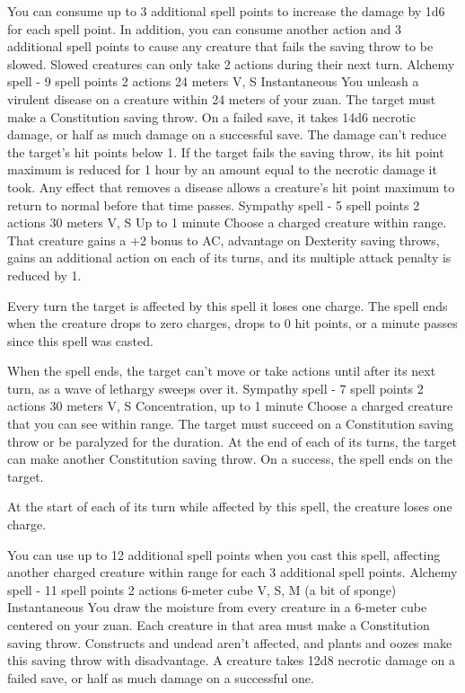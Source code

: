     You can consume up to 3 additional spell points to increase the damage by 1d6 for each spell point.
    In addition, you can consume another action and 3 additional spell points to cause any creature that fails the saving throw to be slowed.
    Slowed creatures can only take 2 actions during their next turn.
    {Alchemy spell - 9 spell points}
    {2 actions}
    {24 meters}
    {V, S}
    {Instantaneous}
    You unleash a virulent disease on a creature within 24 meters of your zuan.
    The target must make a Constitution saving throw.
    On a failed save, it takes 14d6 necrotic damage, or half as much damage on a successful save.
    The damage can't reduce the target's hit points below 1.
    If the target fails the saving throw, its hit point maximum is reduced for 1 hour by an amount equal to the necrotic damage it took.
    Any effect that removes a disease allows a creature's hit point maximum to return to normal before that time passes.
    {Sympathy spell - 5 spell points}
    {2 actions}
    {30 meters}
    {V, S}
    {Up to 1 minute}
    Choose a charged creature within range.
    That creature gains a +2 bonus to AC, advantage on Dexterity saving throws, gains an additional action on each of its turns, and its multiple attack penalty is reduced by 1.

    Every turn the target is affected by this spell it loses one charge.
    The spell ends when the creature drops to zero charges, drops to 0 hit points, or a minute passes since this spell was casted.

    When the spell ends, the target can't move or take actions until after its next turn, as a wave of lethargy sweeps over it.
    {Sympathy spell - 7 spell points}
    {2 actions}
    {30 meters}
    {V, S}
    {Concentration, up to 1 minute}
    Choose a charged creature that you can see within range.
    The target must succeed on a Constitution saving throw or be paralyzed for the duration.
    At the end of each of its turns, the target can make another Constitution saving throw.
    On a success, the spell ends on the target.

    At the start of each of its turn while affected by this spell, the creature loses one charge.

    You can use up to 12 additional spell points when you cast this spell, affecting another charged creature within range for each 3 additional spell points.
    {Alchemy spell - 11 spell points}
    {2 actions}
    {6-meter cube}
    {V, S, M (a bit of sponge)}
    {Instantaneous}
    You draw the moisture from every creature in a 6-meter cube centered on your zuan.
    Each creature in that area must make a Constitution saving throw.
    Constructs and undead aren't affected, and plants and oozes make this saving throw with disadvantage.
    A creature takes 12d8 necrotic damage on a failed save, or half as much damage on a successful one.

